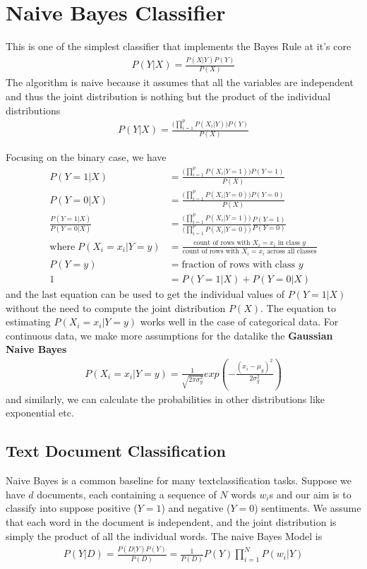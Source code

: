 \documentclass[../statistical_learning_notes.tex]{subfiles}
\begin{document}
\section{Naive Bayes Classifier}
This is one of the simplest classifier that implements the Bayes Rule at it's core
\begin{align*}
    P(Y|X) = \frac{P(X|Y)P(Y)}{P(X)}
\end{align*}
The algorithm is naive because it assumes that all the variables are independent and thus the joint distribution is nothing but the product of the individual distributions
\begin{align*}
    P(Y|X) = \frac{\bigg( \prod_{i=1}^{p} P(X_{i}|Y) \bigg) P(Y)}{P(X)}
\end{align*}

Focusing on the binary case, we have
\begin{align*}
    P(Y=1|X) &= \frac{\bigg( \prod_{i=1}^{p} P(X_{i}|Y=1) \bigg) P(Y=1)}{P(X)}\\
    P(Y=0|X) &= \frac{\bigg( \prod_{i=1}^{p} P(X_{i}|Y=0) \bigg) P(Y=0)}{P(X)}\\
    \frac{P(Y=1|X)}{P(Y=0|X)} &= \frac{\bigg( \prod_{i=1}^{p} P(X_{i}|Y=1) \bigg)}{\bigg( \prod_{i=1}^{p} P(X_{i}|Y=0) \bigg)} \frac{P(Y=1)}{P(Y=0)}\\
\text{where} \; P(X_{i} = x_{i}|Y=y) &= \frac{\text{count of rows with } X_{i} = x_{i} \text{ in class } y}{\text{count of rows with } X_{i} = x_{i} \text{ across all classes}}\\
P(Y=y) &= \text{fraction of rows with class } y\\
1 &= P(Y=1|X) + P(Y=0|X)
\end{align*}
and the last equation can be used to get the individual values of $P(Y=1|X)$ without the need to compute the joint distribution $P(X)$.\newline
The equation to estimating $P(X_{i} = x_{i}|Y=y)$ works well in the case of categorical data. For continuous data, we make more assumptions for the datalike the \textbf{Gaussian Naive Bayes}
\begin{align*}
     P(X_{i} = x_{i} | Y=y) = \frac{1}{\sqrt{2\pi \sigma_{y}^{2}}}exp(-\frac{(x_{i} - \mu_{y})^{2}}{2\sigma_{y}^{2}})
\end{align*}
and similarly, we can calculate the probabilities in other distributions like exponential etc.

\subsection{Text Document Classification}
Naive Bayes is a common baseline for many textclassification tasks. Suppose we have $d$ documents, each containing a sequence of $N$ words $w_{i}$s and our aim is to classify into suppose positive ($Y=1$) and negative ($Y=0$) sentiments. We assume that each word in the document is independent, and the joint distribution is simply the product of all the individual words. The naive Bayes Model is
\begin{align*}
    P(Y|D) = \frac{P(D|Y)P(Y)}{P(D)} = \frac{1}{P(D)} P(Y) \prod_{i=1}^{N} P(w_{i}|Y)
\end{align*}
\end{document}
